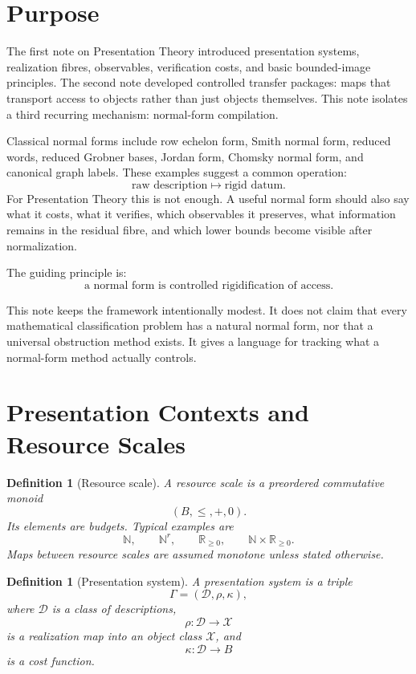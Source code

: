 \documentclass[11pt]{article}
\newtheorem{definition}[theorem]{Definition}
\begin{document}
\section{Purpose}

The first note on Presentation Theory introduced presentation systems, realization fibres, observables, verification costs, and basic bounded-image principles. The second note developed controlled transfer packages: maps that transport access to objects rather than just objects themselves. This note isolates a third recurring mechanism: normal-form compilation.

Classical normal forms include row echelon form, Smith normal form, reduced words, reduced Grobner bases, Jordan form, Chomsky normal form, and canonical graph labels. These examples suggest a common operation:
\[
\text{raw description}\longmapsto \text{rigid datum}.
\]
For Presentation Theory this is not enough. A useful normal form should also say what it costs, what it verifies, which observables it preserves, what information remains in the residual fibre, and which lower bounds become visible after normalization.

The guiding principle is:
\[
\boxed{
\text{a normal form is controlled rigidification of access.}
}
\]

This note keeps the framework intentionally modest. It does not claim that every mathematical classification problem has a natural normal form, nor that a universal obstruction method exists. It gives a language for tracking what a normal-form method actually controls.

\section{Presentation Contexts and Resource Scales}

\begin{definition}[Resource scale]
A resource scale is a preordered commutative monoid
\[
(B,\leq,+,0).
\]
Its elements are budgets. Typical examples are
\[
\mathbb N,\qquad \mathbb N^r,\qquad \mathbb R_{\geq0},\qquad
\mathbb N\times\mathbb R_{\geq0}.
\]
Maps between resource scales are assumed monotone unless stated otherwise.
\end{definition}

\begin{definition}[Presentation system]
A presentation system is a triple
\[
\Gamma=(\mathcal D,\rho,\kappa),
\]
where \(\mathcal D\) is a class of descriptions,
\[
\rho:\mathcal D\to \mathcal X
\]
is a realization map into an object class \(\mathcal X\), and
\[
\kappa:\mathcal D\to B
\]
is a cost function.
\end{definition}
\end{document}
